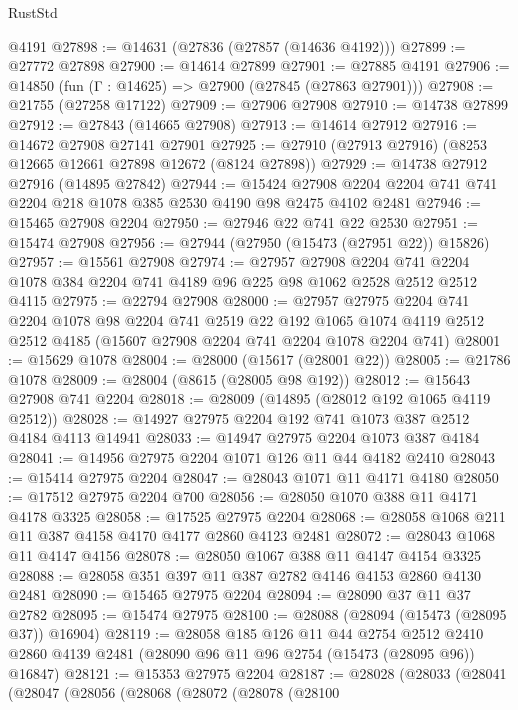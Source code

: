 \begin{lexlean}{RustStd}
\begin{coremodule}
    @4191
@27898 := @14631 (@27836 (@27857 (@14636 @4192)))
@27899 := @27772 @27898
@27900 := @14614 @27899
@27901 := @27885 @4191
@27906 := @14850 (fun (Γ : @14625) => @27900 (@27845 (@27863 @27901)))
@27908 := @21755 (@27258 @17122)
@27909 := @27906 @27908
@27910 := @14738 @27899
@27912 := @27843 (@14665 @27908)
@27913 := @14614 @27912
@27916 := @14672 @27908 @27141 @27901
@27925 := @27910 (@27913 @27916) (@8253 @12665 @12661 @27898 @12672 (@8124 @27898))
@27929 := @14738 @27912 @27916 (@14895 @27842)
@27944 := @15424
    @27908
    @2204
    @2204
    @741
    @741
    @2204
    @218
    @1078
    @385
    @2530
    @4190
    @98
    @2475
    @4102
    @2481
@27946 := @15465 @27908 @2204
@27950 := @27946 @22 @741 @22 @2530
@27951 := @15474 @27908
@27956 := @27944 (@27950 (@15473 (@27951 @22)) @15826)
@27957 := @15561 @27908
@27974 := @27957
    @27908
    @2204
    @741
    @2204
    @1078
    @384
    @2204
    @741
    @4189
    @96
    @225
    @98
    @1062
    @2528
    @2512
    @2512
    @4115
@27975 := @22794 @27908
@28000 := @27957
    @27975
    @2204
    @741
    @2204
    @1078
    @98
    @2204
    @741
    @2519
    @22
    @192
    @1065
    @1074
    @4119
    @2512
    @2512
    @4185
    (@15607 @27908 @2204 @741 @2204 @1078 @2204 @741)
@28001 := @15629 @1078
@28004 := @28000 (@15617 (@28001 @22))
@28005 := @21786 @1078
@28009 := @28004 (@8615 (@28005 @98 @192))
@28012 := @15643 @27908 @741 @2204
@28018 := @28009 (@14895 (@28012 @192 @1065 @4119 @2512))
@28028 := @14927 @27975 @2204 @192 @741 @1073 @387 @2512 @4184 @4113 @14941
@28033 := @14947 @27975 @2204 @1073 @387 @4184
@28041 := @14956 @27975 @2204 @1071 @126 @11 @44 @4182 @2410
@28043 := @15414 @27975 @2204
@28047 := @28043 @1071 @11 @4171 @4180
@28050 := @17512 @27975 @2204 @700
@28056 := @28050 @1070 @388 @11 @4171 @4178 @3325
@28058 := @17525 @27975 @2204
@28068 := @28058 @1068 @211 @11 @387 @4158 @4170 @4177 @2860 @4123 @2481
@28072 := @28043 @1068 @11 @4147 @4156
@28078 := @28050 @1067 @388 @11 @4147 @4154 @3325
@28088 := @28058 @351 @397 @11 @387 @2782 @4146 @4153 @2860 @4130 @2481
@28090 := @15465 @27975 @2204
@28094 := @28090 @37 @11 @37 @2782
@28095 := @15474 @27975
@28100 := @28088 (@28094 (@15473 (@28095 @37)) @16904)
@28119 := @28058
    @185
    @126
    @11
    @44
    @2754
    @2512
    @2410
    @2860
    @4139
    @2481
    (@28090 @96 @11 @96 @2754 (@15473 (@28095 @96)) @16847)
@28121 := @15353 @27975 @2204
@28187 := @28028
    (@28033
      (@28041
        (@28047
          (@28056
            (@28068
              (@28072
                (@28078
                  (@28100

\end{coremodule}
\end{lexlean}
